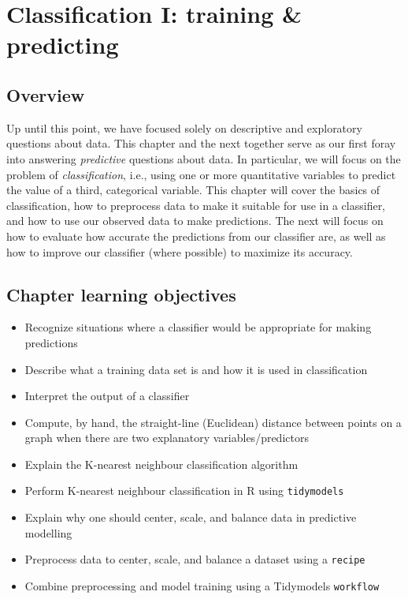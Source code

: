 \documentclass[
]{krantz}
\providecommand{\tightlist}{%
  \setlength{\itemsep}{0pt}\setlength{\parskip}{0pt}}
\begin{document}
\hypertarget{classification}{%
\chapter{Classification I: training \& predicting}\label{classification}}

\hypertarget{overview-4}{%
\section{Overview}\label{overview-4}}

Up until this point, we have focused solely on descriptive and exploratory
questions about data. This chapter and the next together serve as our first
foray into answering \emph{predictive} questions about data. In particular, we will
focus on the problem of \emph{classification}, i.e., using one or more quantitative
variables to predict the value of a third, categorical variable. This chapter
will cover the basics of classification, how to preprocess data to make it
suitable for use in a classifier, and how to use our observed data to make
predictions. The next will focus on how to evaluate how accurate the
predictions from our classifier are, as well as how to improve our classifier
(where possible) to maximize its accuracy.

\hypertarget{chapter-learning-objectives-5}{%
\section{Chapter learning objectives}\label{chapter-learning-objectives-5}}

\begin{itemize}
\tightlist
\item
  Recognize situations where a classifier would be appropriate for making predictions
\item
  Describe what a training data set is and how it is used in classification
\item
  Interpret the output of a classifier
\item
  Compute, by hand, the straight-line (Euclidean) distance between points on a graph when there are two explanatory variables/predictors
\item
  Explain the K-nearest neighbour classification algorithm
\item
  Perform K-nearest neighbour classification in R using \texttt{tidymodels}\\
\item
  Explain why one should center, scale, and balance data in predictive modelling
\item
  Preprocess data to center, scale, and balance a dataset using a \texttt{recipe}
\item
  Combine preprocessing and model training using a Tidymodels \texttt{workflow}
\end{itemize}
\end{document}
